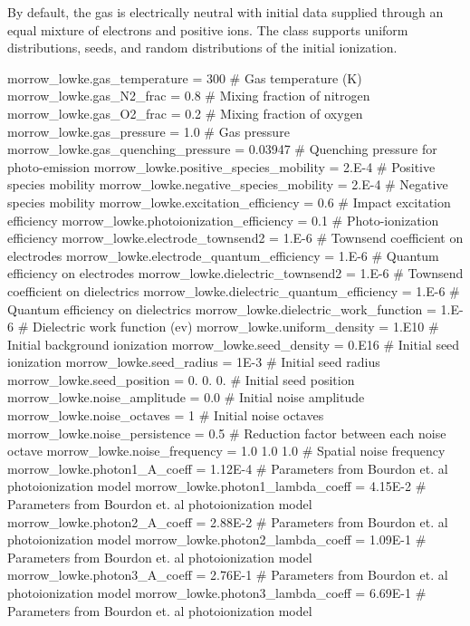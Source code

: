 By default, the gas is electrically neutral with initial data supplied through an equal mixture of electrons and positive ions. The class supports uniform distributions, seeds, and random distributions of the initial ionization. \begin{DoxyVerb}morrow_lowke.gas_temperature               = 300                   # Gas temperature (K)
morrow_lowke.gas_N2_frac                   = 0.8                   # Mixing fraction of nitrogen
morrow_lowke.gas_O2_frac                   = 0.2                   # Mixing fraction of oxygen
morrow_lowke.gas_pressure                  = 1.0                   # Gas pressure
morrow_lowke.gas_quenching_pressure        = 0.03947               # Quenching pressure for photo-emission
morrow_lowke.positive_species_mobility     = 2.E-4                 # Positive species mobility
morrow_lowke.negative_species_mobility     = 2.E-4                 # Negative species mobility
morrow_lowke.excitation_efficiency         = 0.6                   # Impact excitation efficiency
morrow_lowke.photoionization_efficiency    = 0.1                   # Photo-ionization efficiency
morrow_lowke.electrode_townsend2           = 1.E-6                 # Townsend coefficient on electrodes
morrow_lowke.electrode_quantum_efficiency  = 1.E-6                 # Quantum efficiency on electrodes
morrow_lowke.dielectric_townsend2          = 1.E-6                 # Townsend coefficient on dielectrics
morrow_lowke.dielectric_quantum_efficiency = 1.E-6                 # Quantum efficiency on dielectrics
morrow_lowke.dielectric_work_function      = 1.E-6                 # Dielectric work function (ev)
morrow_lowke.uniform_density               = 1.E10                 # Initial background ionization
morrow_lowke.seed_density                  = 0.E16                 # Initial seed ionization
morrow_lowke.seed_radius                   = 1E-3                  # Initial seed radius
morrow_lowke.seed_position                 = 0. 0. 0.              # Initial seed position
morrow_lowke.noise_amplitude               = 0.0                   # Initial noise amplitude
morrow_lowke.noise_octaves                 = 1                     # Initial noise octaves
morrow_lowke.noise_persistence             = 0.5                   # Reduction factor between each noise octave
morrow_lowke.noise_frequency               = 1.0 1.0 1.0           # Spatial noise frequency
morrow_lowke.photon1_A_coeff               = 1.12E-4               # Parameters from Bourdon et. al photoionization model
morrow_lowke.photon1_lambda_coeff          = 4.15E-2               # Parameters from Bourdon et. al photoionization model
morrow_lowke.photon2_A_coeff               = 2.88E-2               # Parameters from Bourdon et. al photoionization model
morrow_lowke.photon2_lambda_coeff          = 1.09E-1               # Parameters from Bourdon et. al photoionization model
morrow_lowke.photon3_A_coeff               = 2.76E-1               # Parameters from Bourdon et. al photoionization model
morrow_lowke.photon3_lambda_coeff          = 6.69E-1               # Parameters from Bourdon et. al photoionization model\end{DoxyVerb}
 

